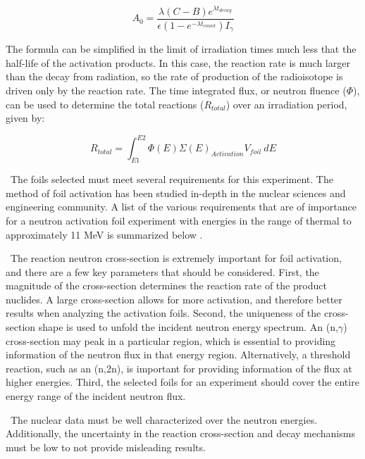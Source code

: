 \documentclass[journal]{IEEEtran}
\begin{document}
	\begin{equation} \label{eq:MeasActivity}
	A_{0} = \frac{\lambda (C-B) e^{\lambda t_{decay}}}{\epsilon (1-e^{-\lambda 
			t_{count}})I_{\gamma}}
	\end{equation}
	
	The formula can be simplified in the limit of irradiation times much less that 
	the half-life of the activation products. In this case, the reaction rate is 
	much larger than the decay from radiation, so the rate of production of the 
	radioisotope is driven only by the reaction rate. The time integrated flux, 
	or neutron fluence ($\Phi$), can be used to determine the total reactions ($R_{total}$)
	over an irradiation period, given by:
	
	\begin{equation} \label{eq:NIFrxnRate}
	R_{total} = \int_{E1}^{E2} \Phi(E) \Sigma(E) _{Activation} V_{foil} 
	\:dE 
	\end{equation}
	
	\ The foils selected must meet several requirements for this experiment. The method of foil activation has been studied in-depth in the nuclear sciences and engineering community. A list of the various requirements that are of importance for a neutron activation foil experiment 
	with energies in the range of thermal to approximately 11 MeV is summarized below \cite{Knoll,Luciano2012a,Kuijpers1977}.
	
	\ The reaction neutron cross-section is extremely important for foil 
	activation, and there are a few key parameters that should be considered. 
	First, the magnitude of the cross-section determines the 
	reaction rate of the product nuclides. A large cross-section allows for 
	more activation, and therefore better results when analyzing the activation 
	foils. Second, the uniqueness of the cross-section shape is used to unfold 
	the incident neutron energy spectrum. An (n,$\gamma$) cross-section may 
	peak in a particular region, which is essential to providing information of the 
	neutron flux in that energy region. Alternatively, a threshold reaction, 
	such as an (n,2n), is important for providing information of the flux at 
	higher energies. Third, the selected foils for an experiment should cover  
	the entire energy range of the incident neutron flux. 
	
	\ The nuclear data must be well characterized over the neutron 
	energies. Additionally, the uncertainty in the reaction cross-section and 
	decay mechanisms must be low to not provide misleading results. 
	
\end{document}
